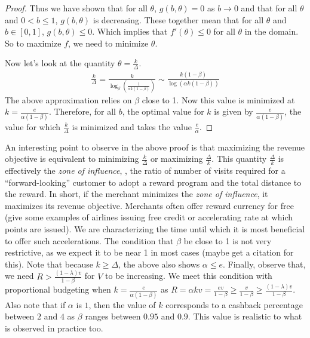 \begin{proof}
Thus we have shown that for all $\theta$, $g(b,\theta) = 0$ as $b \to 0$ and that for all $\theta$ and $0 < b \leq 1$, $g(b,\theta)$ is decreasing. 
These together mean that for all $\theta$ and $b \in [0,1]$, $g(b,\theta) \leq 0$. 
Which implies that $f'(\theta) \le 0$ for all $\theta$ in the domain.
So to maximize $f$, we need to minimize $\theta$.

Now let's look at the quantity $\theta = \frac{k}{\Delta}$.
\begin{align*}
\frac{k}{\Delta} = \frac{k}{\log_\beta\left(\frac{1}{\alpha k(1-\beta)}\right)} \sim \frac{k(1-\beta)}{\log (\alpha k(1-\beta))} 
\end{align*}
The above approximation relies on $\beta$ close to 1. Now this value is minimized at $k = \frac{e}{\alpha(1-\beta)}$. Therefore, for all $b$, the optimal value for $k$ is given by $\frac{e}{\alpha(1-\beta)}$, the value for which $\frac{k}{\Delta}$ is minimized and takes the value $\frac{e}{\alpha}$. 

\end{proof}

An interesting point to observe in the above proof is that maximizing the revenue objective is equivalent to minimizing $\frac{k}{\Delta}$ or maximizing $\frac{\Delta}{k}$. This quantity $\frac{\Delta}{k}$ is effectively the \emph{zone of influence}, \ie, the ratio of number of visits required for a ``forward-looking'' customer to adopt a reward program and the total distance to the reward.
In short, if the merchant minimizes the \emph{zone of influence}, it maximizes its revenue objective.
Merchants often offer reward currency for free (give some examples of airlines issuing free credit or accelerating rate at which points are issued). We are characterizing the time until which it is most beneficial to offer such accelerations. 
The condition that $\beta$ be close to 1 is not very restrictive, as we expect it to be near 1 in most cases {\nolan (maybe get a citation for this)}. Note that because $k \geq \Delta$, the above also shows $\alpha \leq e$. 
Finally, observe that, we need $R > \frac{(1-\lambda)v}{1-\beta}$ for $V$ to be increasing. 
We meet this condition with proportional budgeting when $k = \frac{e}{\alpha(1-\beta)}$ as $R = \alpha k v = \frac{e v}{1-\beta} \geq \frac{v}{1-\beta} \geq \frac{(1-\lambda)v}{1-\beta}$. 
Also note that if $\alpha$ is $1$, then the value of $k$ corresponds to a cashback percentage between $2$ and $4$ as $\beta$ ranges between $0.95$ and $0.9$.
This value is realistic to what is observed in practice too.

